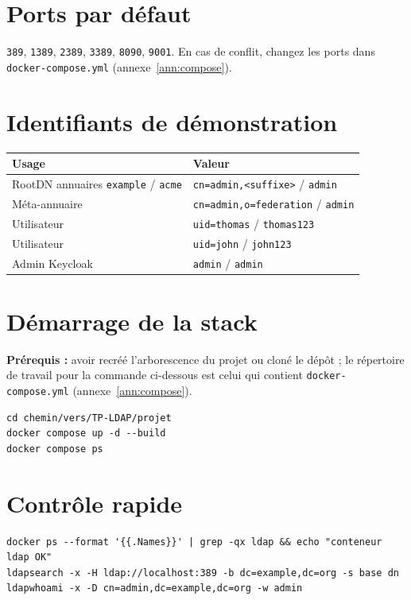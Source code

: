 \documentclass[11pt,a4paper]{report}
\begin{document}
\section{Ports par défaut}

\texttt{389}, \texttt{1389}, \texttt{2389}, \texttt{3389}, \texttt{8090}, \texttt{9001}. En cas de conflit, changez les ports dans \texttt{docker-compose.yml} (annexe~\ref{ann:compose}).

\section{Identifiants de démonstration}

\begin{tabular}{@{}ll@{}}
\toprule
\textbf{Usage} & \textbf{Valeur} \\
\midrule
RootDN annuaires \texttt{example} / \texttt{acme} & \texttt{cn=admin,<suffixe>} / \texttt{admin} \\
Méta-annuaire & \texttt{cn=admin,o=federation} / \texttt{admin} \\
Utilisateur & \texttt{uid=thomas} / \texttt{thomas123} \\
Utilisateur & \texttt{uid=john} / \texttt{john123} \\
Admin Keycloak & \texttt{admin} / \texttt{admin} \\
\bottomrule
\end{tabular}

\section{Démarrage de la stack}

\textbf{Prérequis :} avoir recréé l'arborescence du projet ou cloné le dépôt ; le répertoire de travail pour la commande ci-dessous est celui qui contient \texttt{docker-compose.yml} (annexe~\ref{ann:compose}).

\begin{lstlisting}[style=bashstyle]
cd chemin/vers/TP-LDAP/projet
docker compose up -d --build
docker compose ps
\end{lstlisting}

\section{Contrôle rapide}

\begin{lstlisting}[style=bashstyle]
docker ps --format '{{.Names}}' | grep -qx ldap && echo "conteneur ldap OK"
ldapsearch -x -H ldap://localhost:389 -b dc=example,dc=org -s base dn
ldapwhoami -x -D cn=admin,dc=example,dc=org -w admin
\end{lstlisting}
\end{document}
